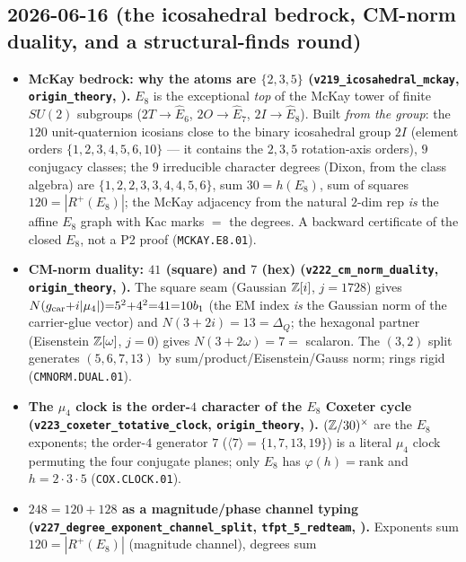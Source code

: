 \subsection*{2026-06-16 (the icosahedral bedrock, CM-norm duality, and a structural-finds round)}
\begin{itemize}
\item \textbf{McKay bedrock: why the atoms are $\{2,3,5\}$ (\texttt{v219\_icosahedral\_mckay},
  \texttt{origin\_theory}, \mE).} $E_8$ is the exceptional \emph{top} of the McKay tower of finite
  $SU(2)$ subgroups ($2T{\to}\hat E_6$, $2O{\to}\hat E_7$, $2I{\to}\hat E_8$). Built \emph{from the
  group}: the $120$ unit-quaternion icosians close to the binary icosahedral group $2I$ (element orders
  $\{1,2,3,4,5,6,10\}$ --- it contains the $2,3,5$ rotation-axis orders), $9$ conjugacy classes; the
  $9$ irreducible character degrees (Dixon, from the class algebra) are $\{1,2,2,3,3,4,4,5,6\}$, sum
  $30{=}h(E_8)$, sum of squares $120{=}|R^+(E_8)|$; the McKay adjacency from the natural $2$-dim rep
  \emph{is} the affine $E_8$ graph with Kac marks $=$ the degrees. A backward certificate of the closed
  $E_8$, not a P2 proof (\texttt{MCKAY.E8.01}).
\item \textbf{CM-norm duality: $41$ (square) and $7$ (hex) (\texttt{v222\_cm\_norm\_duality},
  \texttt{origin\_theory}, \mE).} The square seam (Gaussian $\mathbb{Z}[i]$, $j{=}1728$) gives
  $N(g_{\mathrm{car}}{+}i|\mu_4|){=}5^2{+}4^2{=}41{=}10b_1$ (the EM index \emph{is} the Gaussian norm of the
  carrier-glue vector) and $N(3{+}2i){=}13{=}\Delta_Q$; the hexagonal partner (Eisenstein $\mathbb{Z}[\omega]$,
  $j{=}0$) gives $N(3{+}2\omega){=}7{=}$ scalaron. The $(3,2)$ split generates $(5,6,7,13)$ by
  sum/product/Eisenstein/Gauss norm; rings rigid (\texttt{CMNORM.DUAL.01}).
\item \textbf{The $\mu_4$ clock is the order-$4$ character of the $E_8$ Coxeter cycle
  (\texttt{v223\_\allowbreak coxeter\_\allowbreak totative\_\allowbreak clock}, \texttt{origin\_theory}, \mE).} $(\mathbb{Z}/30)^\times$ are the
  $E_8$ exponents; the order-$4$ generator $7$ ($\langle7\rangle{=}\{1,7,13,19\}$) is a literal $\mu_4$
  clock permuting the four conjugate planes; only $E_8$ has $\varphi(h){=}\mathrm{rank}$ and
  $h{=}2{\cdot}3{\cdot}5$ (\texttt{COX.CLOCK.01}).
\item \textbf{$248{=}120{+}128$ as a magnitude/phase channel typing
  (\texttt{v227\_\allowbreak degree\_\allowbreak exponent\_\allowbreak channel\_\allowbreak split},
  \texttt{tfpt\_5\_redteam}, \mE).} Exponents sum $120{=}|R^+(E_8)|$ (magnitude channel), degrees sum

\end{itemize}
